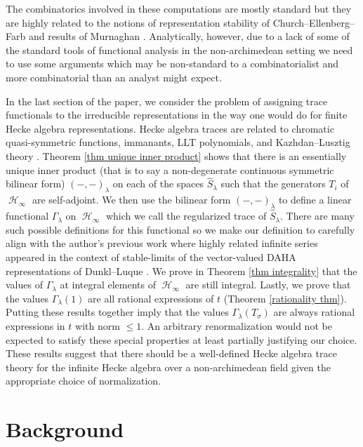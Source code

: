 \documentclass[12pt,reqno]{amsart}
\theoremstyle{definition}
\DeclareMathOperator{\cH}{\mathcal{H}}
\begin{document}
The combinatorics involved in these computations are mostly standard but they are highly related to the notions of representation stability of Church--Ellenberg--Farb \cite{CEF15} and results of Murnaghan \cite{M_1938}. Analytically, however, due to a lack of some of the standard tools of functional analysis in the non-archimedean setting we need to use some arguments which may be non-standard to a combinatorialist and more combinatorial than an analyst might expect.

In the last section of the paper, we consider the problem of assigning trace functionals to the irreducible representations in the way one would do for finite Hecke algebra representations. Hecke algebra traces are related to chromatic quasi-symmetric functions, immanants, LLT polynomials, and Kazhdan--Lusztig theory \cite{Haiman} \cite{SW16} \cite{MSW}. Theorem \ref{thm unique inner product} shows that there is an essentially unique inner product (that is to say a non-degenerate continuous symmetric bilinear form) $(-,-)_{\lambda}$ on each of the spaces $\hat{S}_{\lambda}$ such that the generators $T_i$ of $\cH_{\infty}$ are self-adjoint. We then use the bilinear form $(-,-)_{\lambda}$ to define a linear functional $\Gamma_{\lambda}$ on $\cH_{\infty}$ which we call the regularized trace of $\hat{S}_{\lambda}.$ There are many such possible definitions for this functional so we make our definition to carefully align with the author's previous work \cite{BWMurnaghan} where highly related infinite series appeared in the context of stable-limits of the vector-valued DAHA representations of Dunkl--Luque \cite{DL_2011}. We prove in Theorem \ref{thm integrality} that the values of $\Gamma_{\lambda}$ at integral elements of $\cH_{\infty}$ are still integral. Lastly, we prove that the values $\Gamma_{\lambda}(1)$ are all rational expressions of $t$ (Theorem \ref{rationality thm}). Putting these results together imply that the values $\Gamma_{\lambda}(T_{\sigma})$ are always rational expressions in $t$ with norm $\leq 1.$ An arbitrary renormalization would not be expected to satisfy these special properties at least partially justifying our choice. These results suggest that there should be a well-defined Hecke algebra trace theory for the infinite Hecke algebra over a non-archimedean field given the appropriate choice of normalization.

\section{Background}
\end{document}
